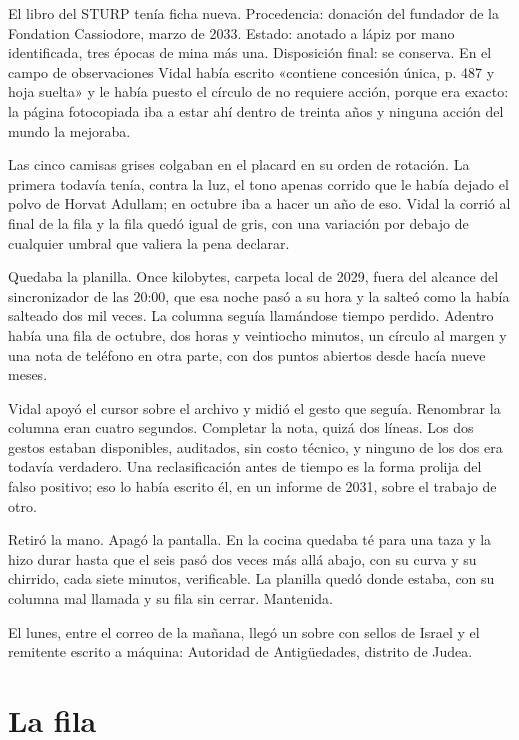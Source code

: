 El libro del STURP tenía ficha nueva. Procedencia: donación del fundador de la Fondation Cassiodore, marzo de 2033. Estado: anotado a lápiz por mano identificada, tres épocas de mina más una. Disposición final: se conserva. En el campo de observaciones Vidal había escrito «contiene concesión única, p. 487 y hoja suelta» y le había puesto el círculo de no requiere acción, porque era exacto: la página fotocopiada iba a estar ahí dentro de treinta años y ninguna acción del mundo la mejoraba.

Las cinco camisas grises colgaban en el placard en su orden de rotación. La primera todavía tenía, contra la luz, el tono apenas corrido que le había dejado el polvo de Horvat Adullam; en octubre iba a hacer un año de eso. Vidal la corrió al final de la fila y la fila quedó igual de gris, con una variación por debajo de cualquier umbral que valiera la pena declarar.

Quedaba la planilla. Once kilobytes, carpeta local de 2029, fuera del alcance del sincronizador de las 20:00, que esa noche pasó a su hora y la salteó como la había salteado dos mil veces. La columna seguía llamándose tiempo perdido. Adentro había una fila de octubre, dos horas y veintiocho minutos, un círculo al margen y una nota de teléfono en otra parte, con dos puntos abiertos desde hacía nueve meses.

Vidal apoyó el cursor sobre el archivo y midió el gesto que seguía. Renombrar la columna eran cuatro segundos. Completar la nota, quizá dos líneas. Los dos gestos estaban disponibles, auditados, sin costo técnico, y ninguno de los dos era todavía verdadero. Una reclasificación antes de tiempo es la forma prolija del falso positivo; eso lo había escrito él, en un informe de 2031, sobre el trabajo de otro.

Retiró la mano. Apagó la pantalla. En la cocina quedaba té para una taza y la hizo durar hasta que el seis pasó dos veces más allá abajo, con su curva y su chirrido, cada siete minutos, verificable. La planilla quedó donde estaba, con su columna mal llamada y su fila sin cerrar. Mantenida.

El lunes, entre el correo de la mañana, llegó un sobre con sellos de Israel y el remitente escrito a máquina: Autoridad de Antigüedades, distrito de Judea.

\clearpage

\chapter{La fila}

